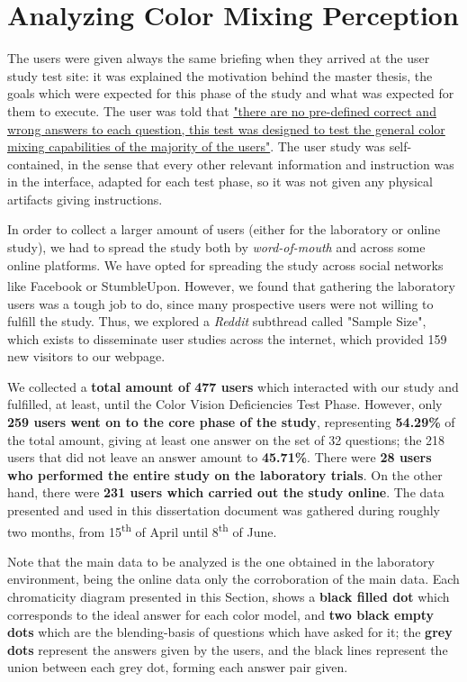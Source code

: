 
\section{Analyzing Color Mixing Perception}
\label{sec:results}
%
The users were given always the same briefing when they arrived at the user study test site: it was
explained the motivation behind the master thesis, the goals which were expected for this phase of
the study and what was expected for them to execute. The user was told that \ul{"there are no
pre-defined correct and wrong answers to each question, this test was designed to test the general
color mixing capabilities of the majority of the users"}. The user study was self-contained, in the
sense that every other relevant information and instruction was in the interface, adapted for each
test phase, so it was not given any physical artifacts giving instructions. \par
%
In order to collect a larger amount of users (either for the laboratory or online study), we had to
spread the study both by \emph{word-of-mouth} and across some online platforms. We have opted for
spreading the study across social networks like Facebook\textsuperscript{\textregistered} or
StumbleUpon. However, we found that gathering the laboratory users was a tough job to do, since many
prospective users were not willing to fulfill the study. Thus, we explored a \emph{Reddit} subthread
called "Sample Size", which exists to disseminate user studies across the internet, which provided
159 new visitors to our webpage. \par
%
We collected a \textbf{total amount of 477 users} which interacted with our study and fulfilled, at
least, until the Color Vision Deficiencies Test Phase. However, only \textbf{259 users went on to
the core phase of the study}, representing \textbf{54.29\%} of the total amount, giving at least one
answer on the set of 32 questions; the 218 users that did not leave an answer amount to
\textbf{45.71\%}. There were \textbf{28 users who performed the entire study on the laboratory trials}.
On the other hand, there were \textbf{231 users which carried out the study online}. The data presented
and used in this dissertation document was gathered during roughly two months, from 15\textsuperscript{th}
of April until 8\textsuperscript{th} of June. \par
%
Note that the main data to be analyzed is the one obtained in the laboratory environment, being the
online data only the corroboration of the main data. Each chromaticity diagram presented in this Section,
shows a \textbf{black filled dot} which corresponds to the ideal answer for each color model, and
\textbf{two black empty dots} which are the blending-basis of questions which have asked for it; the
\textbf{grey dots} represent the answers given by the users, and the black lines represent the union
between each grey dot, forming each answer pair given.
%
